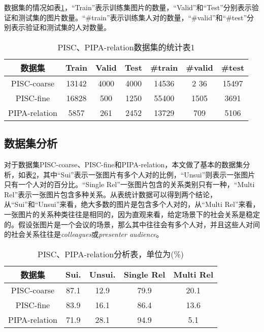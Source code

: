 数据集的情况如表\ref{tab:exp-sta-one}，``Train''表示训练集图片的数量，``Valid''和``Test''分别表示验证和测试集的图片数量。``\#train''表示训练集人对的数量，``\#valid''和``\#test''分别表示验证和测试集的人对数量。
\begin{table}[htpb]
  \centering
  \caption{PISC、PIPA-relation数据集的统计表1}
  \label{tab:exp-sta-one}
  \setlength{\tabcolsep}{4.5mm}
  \begin{tabular}{c|c|c|c|c|c|c}
    \toprule
    数据集 & Train & Valid & Test & \#train  &  \#valid &  \#test  \\
    \midrule
    PISC-coarse & 13142 & 4000 & 4000 & 14536 & 2
    36 & 15497   \\
    \midrule
    PISC-fine &  16828 & 500 & 1250 & 55400 & 1505 & 3691 \\
    \midrule
    PIPA-relation & 5857 & 261 & 2452 & 13729 & 709 & 5106 \\
    \bottomrule
  \end{tabular}
\end{table}

\subsection{数据集分析} \label{sec:exp-dataset-ana}

对于数据集PISC-coarse、PISC-fine和PIPA-relation，本文做了基本的数据集分析，如表\ref{tab:exp-sta-two}，其中``Sui''表示一张图片有多个人对的比例，``Unsui''则表示一张图片只有一个人对的百分比。``Single Rel''一张图片包含的关系类别只有一种，``Multi Rel''表示一张图片包含多种关系。从表统计数据可以得到两个结论，从``Sui''和``Unsui''来看，绝大多数的图片是包含多个人对的，从``Multi Rel''来看，一张图片的关系种类往往是相同的，因为直观来看，给定场景下的社会关系是稳定的。假设张图片是一个会议的场景，那么其中往往会有多个人对，并且这些人对间的社会关系往往是{\it colleagues}或{\it presenter audience}。
\begin{table}[htpb]
  \centering
  \caption{PISC、PIPA-relation分析表，单位为(\%)}
  \label{tab:exp-sta-two}
  \begin{tabular}{c|c|c|c|c}
    \toprule
    数据集 & Sui. & Unsui. & Single Rel & Multi Rel \\
    \midrule
    PISC-coarse  & 87.1 & 12.9 & 79.9 & 20.1 \\
    \midrule
    PISC-fine  & 83.9 & 16.1 & 86.4 & 13.6 \\
    \midrule
    PIPA-relation & 71.9 & 28.1 & 94.9 & 5.1 \\
    \bottomrule
  \end{tabular}
\end{table}

